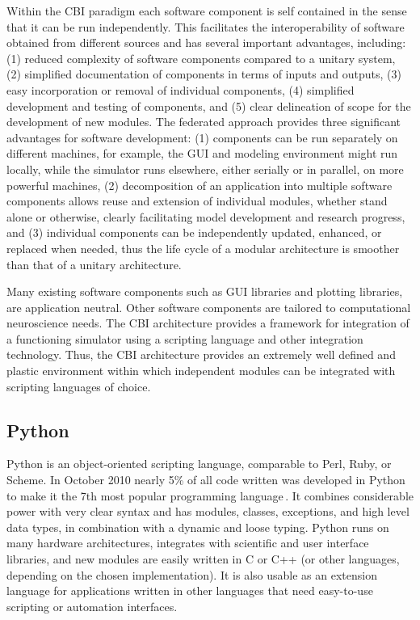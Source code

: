 \documentclass[10pt]{article}
\begin{document}
Within the
CBI paradigm each software component is self contained in the sense
that it can be run independently. This facilitates the
interoperability of software obtained from different sources and has
several important advantages, including: (1) reduced complexity of
software components compared to a unitary system, (2) simplified
documentation of components in terms of inputs and outputs, (3) easy
incorporation or removal of individual components, (4)
simplified development and testing of components, and (5) clear delineation of scope for the development of new
modules. The federated approach provides three significant advantages
for software development: (1) components can be run separately on
different machines, for example, the GUI and modeling environment
might run locally, while the simulator runs elsewhere, either serially
or in parallel, on more powerful machines, (2) decomposition of an
application into multiple software components allows reuse and
extension of individual modules, whether stand alone or otherwise,
clearly facilitating model development and research progress, and (3)
individual components can be independently updated, enhanced, or
replaced when needed, thus the life cycle of a modular architecture is
smoother than that of a unitary architecture.

Many existing software components such as GUI libraries and plotting
libraries, are application neutral.  Other software components are
tailored to computational neuroscience needs.  The CBI
architecture provides a framework for integration of a functioning
simulator using a scripting language and other integration technology.
Thus, the CBI architecture provides an extremely well defined and plastic
environment within which independent modules can be integrated with
scripting languages of choice.

\subsection*{Python}

Python is an object-oriented scripting language, comparable to Perl,
Ruby, or Scheme.  In October 2010 nearly 5\% of all code written was
developed in Python to make it the 7th most popular programming
language\,\cite{software09:_tiobe_progr_commun_index}. It combines
considerable power with very clear syntax and has modules, classes,
exceptions, and high level data types, in combination with a dynamic
and loose typing. Python runs on many hardware architectures, integrates
with scientific and user interface libraries, and new modules are
easily written in C or C++ (or other languages, depending on the
chosen implementation). It is also usable as an extension language for
applications written in other languages that need easy-to-use
scripting or automation interfaces.
\end{document}
